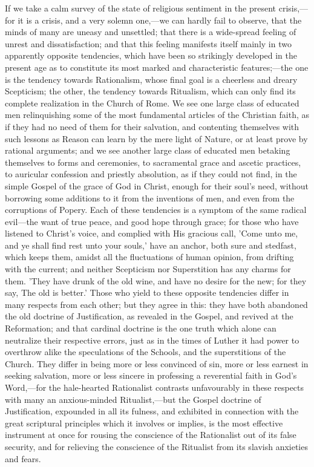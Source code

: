 \documentclass[
]{book}
\begin{document}
If we take a calm survey of the state of religious sentiment in the present crisis,---for it is a crisis, and a very solemn one,---we can hardly fail to observe, that the minds of many are uneasy and unsettled; that there is a wide-spread feeling of unrest and dissatisfaction; and that this feeling manifests itself mainly in two apparently opposite tendencies, which have been so strikingly developed in the present age as to constitute its most marked and characteristic features;---the one is the tendency towards Rationalism, whose final goal is a cheerless and dreary Scepticism; the other, the tendency towards Ritualism, which can only find its complete realization in the Church of Rome. We see one large class of educated men relinquishing some of the most fundamental articles of the Christian faith, as if they had no need of them for their salvation, and contenting themselves with such lessons as Reason can learn by the mere light of Nature, or at least prove by rational arguments; and we see another large class of educated men betaking themselves to forms and ceremonies, to sacramental grace and ascetic practices, to auricular confession and priestly absolution, as if they could not find, in the simple Gospel of the grace of God in Christ, enough for their soul's need, without borrowing some additions to it from the inventions of men, and even from the corruptions of Popery. Each of these tendencies is a symptom of the same radical evil---the want of true peace, and good hope through grace; for those who have listened to Christ's voice, and complied with His gracious call, 'Come unto me, and ye shall find rest unto your souls,' have an anchor, both sure and stedfast, which keeps them, amidst all the fluctuations of human opinion, from drifting with the current; and neither Scepticism nor Superstition has any charms for them. 'They have drunk of the old wine, and have no desire for the new; for they say, The old is better.' Those who yield to these opposite tendencies differ in many respects from each other; but they agree in this: they have both abandoned the old doctrine of Justification, as revealed in the Gospel, and revived at the Reformation; and that cardinal doctrine is the one truth which alone can neutralize their respective errors, just as in the times of Luther it had power to overthrow alike the speculations of the Schools, and the superstitions of the Church. They differ in being more or less convinced of sin, more or less earnest in seeking salvation, more or less sincere in professing a reverential faith in God's Word,---for the hale-hearted Rationalist contrasts unfavourably in these respects with many an anxious-minded Ritualist,---but the Gospel doctrine of Justification, expounded in all its fulness, and exhibited in connection with the great scriptural principles which it involves or implies, is the most effective instrument at once for rousing the conscience of the Rationalist out of its false security, and for relieving the conscience of the Ritualist from its slavish anxieties and fears.
\end{document}
